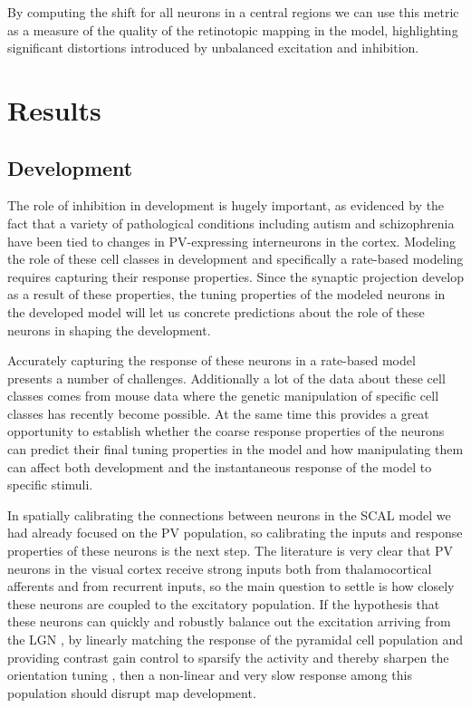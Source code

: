 By computing the shift for all neurons in a central regions we can use
this metric as a measure of the quality of the retinotopic mapping in
the model, highlighting significant distortions introduced by
unbalanced excitation and inhibition.

\section{Results}

\subsection{Development}

The role of inhibition in development is hugely important, as
evidenced by the fact that a variety of pathological conditions
including autism \citep{Wohr2015} and schizophrenia \citep{Lewis2012}
have been tied to changes in PV-expressing interneurons in the
cortex. Modeling the role of these cell classes in development and
specifically a rate-based modeling requires capturing their response
properties. Since the synaptic projection develop as a result of these
properties, the tuning properties of the modeled neurons in the
developed model will let us concrete predictions about the role of
these neurons in shaping the development.

Accurately capturing the response of these neurons in a rate-based
model presents a number of challenges. Additionally a lot of the data
about these cell classes comes from mouse data where the genetic
manipulation of specific cell classes has recently become possible. At
the same time this provides a great opportunity to establish whether
the coarse response properties of the neurons can predict their final
tuning properties in the model and how manipulating them can affect
both development and the instantaneous response of the model to
specific stimuli.

In spatially calibrating the connections between neurons in the SCAL
model we had already focused on the PV population, so calibrating the
inputs and response properties of these neurons is the next step. The
literature is very clear that PV neurons in the visual cortex receive
strong inputs both from thalamocortical afferents and from recurrent
inputs, so the main question to settle is how closely these neurons
are coupled to the excitatory population. If the hypothesis that these
neurons can quickly and robustly balance out the excitation arriving
from the LGN \citep{Swadlow2003, Burkhalter2008}, by linearly matching
the response of the pyramidal cell population and providing contrast
gain control to sparsify the activity and thereby sharpen the
orientation tuning \citep{Wilson2012}, then a non-linear and very slow
response among this population should disrupt map development.


